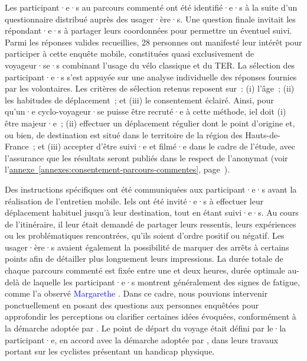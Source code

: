 \begin{refsegment}
Les participant·e·s au parcours commenté ont été identifié·e·s à la suite d’un questionnaire distribué auprès des usager·ère·s. Une question finale invitait les répondant·e·s à partager leurs coordonnées pour permettre un éventuel suivi. Parmi les réponses valides recueillies, 28 personnes ont manifesté leur intérêt pour participer à cette enquête mobile, constituées quasi exclusivement de voyageur·se·s combinant l’usage du vélo classique et du \acrshort{TER}. La sélection des participant·e·s s’est appuyée sur une analyse individuelle des réponses fournies par les volontaires. Les critères de sélection retenus reposent sur~: (i) l'âge~; (ii) les habitudes de déplacement~; et (iii) le consentement éclairé. Ainsi, pour qu'un·e cyclo-voyageur·se puisse être recruté·e à cette méthode, iel doit (i) être majeur·e~; (ii) effectuer un déplacement régulier dont le point d'origine et, ou bien, de destination est situé dans le territoire de la région des Hauts-de-France~; et (iii) accepter d'être suivi·e et filmé·e dans le cadre de l'étude, avec l'assurance que les résultats seront publiés dans le respect de l'anonymat (voir l'\hyperref[annexes:consentement-parcours-commentes]{annexe~\ref{annexes:consentement-parcours-commentes}}, page~\pageref{annexes:consentement-parcours-commentes}).%

Des instructions spécifiques ont été communiquées aux participant·e·s avant la réalisation de l’entretien mobile. Iels ont été invité·e·s à effectuer leur déplacement habituel jusqu’à leur destination, tout en étant suivi·e·s. Au cours de l'itinéraire, il leur était demandé de partager leurs ressentis, leurs expériences ou les problématiques rencontrées, qu’ils soient d’ordre positif ou négatif. Les usager·ère·s avaient également la possibilité de marquer des arrêts à certains points afin de détailler plus longuement leurs impressions. La durée totale de chaque parcours commenté est fixée entre une et deux heures, durée optimale au-delà de laquelle les participant·e·s montrent généralement des signes de fatigue, comme l’a observé \textcolor{blue}{Margarethe} \textcolor{blue}{\textcite[456, 464]{kusenbach_street_2003}}. Dans ce cadre, nous pouvions intervenir ponctuellement en posant des questions aux personnes enquêtées pour approfondir les perceptions ou clarifier certaines idées évoquées, conformément à la démarche adoptée par \textcolor{blue}{\textcite[112]{bergeron_uncovering_2014}}. Le point de départ du voyage était défini par le·la participant·e, en accord avec la démarche adoptée par \textcolor{blue}{\textcite[3]{cox_qualitative_2020}}, dans leurs travaux portant sur les cyclistes présentant un handicap physique.%


\end{refsegment}
